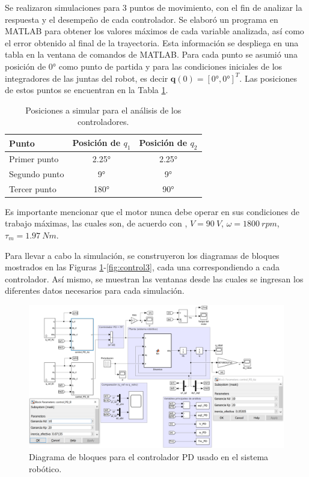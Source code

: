 Se realizaron simulaciones para 3 puntos de movimiento, con el fin de analizar la respuesta y el desempeño de cada controlador. Se elaboró un programa en MATLAB para obtener los valores máximos de cada variable analizada, así como el error obtenido al final de la trayectoria. Esta información se despliega en una tabla en la ventana de comandos de MATLAB. Para cada punto se asumió una posición de 0° como punto de partida y para las condiciones iniciales de los integradores de las juntas del robot, es decir $ \textbf{q}(0)=[0°,0°]^T $. Las posiciones de estos puntos se encuentran en la Tabla \ref{tab:control2}.

\begin{table}[H]
  \centering
  \caption{Posiciones a simular para el análisis de los controladores.}
    \begin{tabular}{|l|c|c|}
    \hline
    \textbf{Punto} & \textbf{Posición de} $ q_1 $ & \textbf{Posición de} $ q_2 $ \\
    \hline
    Primer punto & 2.25° & 2.25° \\
    \hline
    Segundo punto & 9° & 9° \\
    \hline
    Tercer punto & 180° & 90° \\
    \hline
    \end{tabular}%
  \label{tab:control2}%
\end{table}

Es importante mencionar que el motor nunca debe operar en sus condiciones de trabajo máximas, las cuales son, de acuerdo con \cite{DDA1}, $ V=90\ V $, $ \omega=1800\ rpm $, $ \tau_m=1.97\ Nm $.

Para llevar a cabo la simulación, se construyeron los diagramas de bloques mostrados en las Figuras \ref{fig:control1}-\ref{fig:control3}, cada una correspondiendo a cada controlador. Así mismo, se muestran las ventanas desde las cuales se ingresan los diferentes datos necesarios para cada simulación.

\begin{figure}[H]
	\centering
	\includegraphics[width=\columnwidth]{imagenes/control1}
	\caption{Diagrama de bloques para el controlador PD usado en el sistema robótico.}
	\label{fig:control1}
\end{figure}

